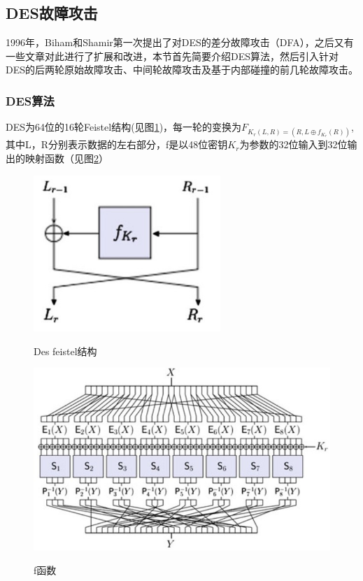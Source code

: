 \documentclass[a4paper,12pt]{article}
\begin{document}
\begin{CJK}{UTF8}{gkai}
\subsection{DES故障攻击}
1996年，Biham和Shamir第一次提出了对DES的差分故障攻击（DFA），之后又有一些文章对此进行了扩展和改进，本节首先简要介绍DES算法，然后引入针对DES的后两轮原始故障攻击、中间轮故障攻击及基于内部碰撞的前几轮故障攻击。
\subsubsection{DES算法}
DES为64位的16轮Feistel结构(见图\ref{des_feistel})，每一轮的变换为$F_{K_r(L,R)=(R,L \oplus f_{K_r}(R))}$,其中L，R分别表示数据的左右部分，f是以48位密钥$K_r$为参数的32位输入到32位输出的映射函数（见图\ref{des_f_function}）
\begin{figure}
\centering
\caption{Des feistel结构}
\includegraphics[width=200pt]{Feistel.jpg}
\label{des_feistel}
\end{figure}

\begin{figure}
\centering
\caption{f函数}
\includegraphics[width=400pt]{des_f_function.jpg}
\label{des_f_function}
\end{figure}



\end{CJK}
\end{document}
